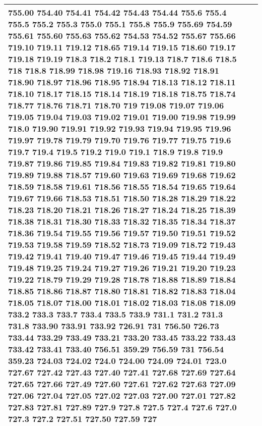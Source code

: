 \begin{longtable}{|L{.1in}|L{.6in}||L{5.65in}|}
755.00 754.40 754.41 754.42 754.43 754.44 755.6 755.4 755.5 755.2 755.3 755.0 755.1 755.8 755.9 755.69 754.59 755.61 755.60 755.63 755.62 754.53 754.52 755.67 755.66 719.10 719.11 719.12 718.65 719.14 719.15 718.60 719.17 719.18 719.19 718.3 718.2 718.1 719.13 718.7 718.6 718.5 718 718.8 718.99 718.98 719.16 718.93 718.92 718.91 718.90 718.97 718.96 718.95 718.94 718.13 718.12 718.11 718.10 718.17 718.15 718.14 718.19 718.18 718.75 718.74 718.77 718.76 718.71 718.70 719 719.08 719.07 719.06 719.05 719.04 719.03 719.02 719.01 719.00 719.98 719.99 718.0 719.90 719.91 719.92 719.93 719.94 719.95 719.96 719.97 719.78 719.79 719.70 719.76 719.77 719.75 719.6 719.7 719.4 719.5 719.2 719.0 719.1 718.9 719.8 719.9 719.87 719.86 719.85 719.84 719.83 719.82 719.81 719.80 719.89 719.88 718.57 719.60 719.63 719.69 719.68 719.62 718.59 718.58 719.61 718.56 718.55 718.54 719.65 719.64 719.67 719.66 718.53 718.51 718.50 718.28 718.29 718.22 718.23 718.20 718.21 718.26 718.27 718.24 718.25 718.39 718.38 718.31 718.30 718.33 718.32 718.35 718.34 718.37 718.36 719.54 719.55 719.56 719.57 719.50 719.51 719.52 719.53 719.58 719.59 718.52 718.73 719.09 718.72 719.43 719.42 719.41 719.40 719.47 719.46 719.45 719.44 719.49 719.48 719.25 719.24 719.27 719.26 719.21 719.20 719.23 719.22 718.79 719.29 719.28 718.78 718.88 718.89 718.84 718.85 718.86 718.87 718.80 718.81 718.82 718.83 718.04 718.05 718.07 718.00 718.01 718.02 718.03 718.08 718.09 733.2 733.3 733.7 733.4 733.5 733.9 731.1 731.2 731.3 731.8 733.90 733.91 733.92 726.91 731 756.50 726.73 733.44 733.29 733.49 733.21 733.20 733.45 733.22 733.43 733.42 733.41 733.40 756.51 359.29 756.59 731 756.54 359.23 724.03 724.02 724.0 724.00 724.09 724.01 723.0 727.67 727.42 727.43 727.40 727.41 727.68 727.69 727.64 727.65 727.66 727.49 727.60 727.61 727.62 727.63 727.09 727.06 727.04 727.05 727.02 727.03 727.00 727.01 727.82 727.83 727.81 727.89 727.9 727.8 727.5 727.4 727.6 727.0 727.3 727.2 727.51 727.50 727.59 727\\\hline

\end{longtable}
